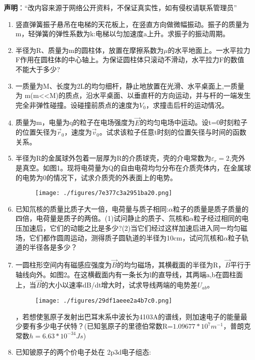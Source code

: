 
\textbf{声明}：“改内容来源于网络公开资料，不保证真实性，如有侵权请联系管理员”
\begin{enumerate}
\item 竖直弹簧振子悬吊在电梯的天花板上，在竖直方向做微幅振动。振子的质量为m，轻弹簧的弹性系数为k:电梯以匀加速度a上升。求振子的振动周期。
\item 半径为R、质量为m的圆柱体，放置在摩擦系数为$\mu$的水平地面上。一水平拉力F作用在圆柱体的中心轴上。为保证圆柱体只滚动不滑动，水平拉力F的数值不能大于多少?
\item 一质量为M、长度为2L的均匀细杆，静止地放置在光滑、水平桌面上,一质量为 m(m<<M)的质点，沿水平桌面、以垂直杆的方向运动，并与杆的一端发生完全非弹性碰撞。设碰撞前质点的速度为$V_0$，求撞击后杆的运动情况。
\item 质量为m，电量为q的粒子在电场强度为$\vec E$的均匀电场中运动。设t=0时刻粒子的位置矢径为$\vec r_0$，速度为$\vec v_0$。试求该粒子任意t时刻的位置矢径与时间的函数关系。
\item 半径为R的金属球外包着一层厚为R的介质球壳，壳的介电常数为$\varepsilon_r=2$,壳外是真空。如图1。现将电荷量为Q的自由电荷均匀分布在介质壳体内，在金属球的电势为0的情况下，试求介质壳的外表面上的电势。
\begin{figure}[ht]
\centering
\texttt{[image: ./figures/7e377c3a2951ba20.png]}
\caption{} \label{fig_SSD04_1}
\end{figure}
\item 已知氘核的质量比质子大一倍，电荷量与质子相同:$\alpha$粒子的质量是质子质量的四倍，电荷量是质子的两倍。(1)试问静止的质子、氘核和$\alpha$粒子经过相同的电压加速后，它们的动能之比是多少?(2)当它们经过这样加速后进入同一均匀磁场，它们都作圆周运动，测得质子圆轨道的半径为10cm，试问氘核和$\alpha$粒子轨道的半径各是多少？
\item 一圆柱形空间内有磁感应强度为$\vec B$的均匀磁场，其横截面的半径为R，$\vec B$平行于轴线向外。如图2。在这横截面内有一条长为l的直导线，其两端a,b在圆柱面上，当$\vec B$的大小以速率dB/dt增大时，试求导线两端的电势差$U_{ab}$。
\begin{figure}[ht]
\centering
\texttt{[image: ./figures/29df1aeee2a4b7c0.png]}
\caption{} \label{fig_SSD04_2}
\end{figure}
，若想使氢原子发射出巴耳末系中波长为4103A的谱线，则加速电子的能量最少要有多少电子伏特？(已知氢原子的里德伯常数R=$1.09677*10^7 m^{-1}$，普朗克常数$h=6.63*10^{-34}Js $)
\item 已知铍原子的两个价电子处在 2p3d电子组态:\\

\end{enumerate}
